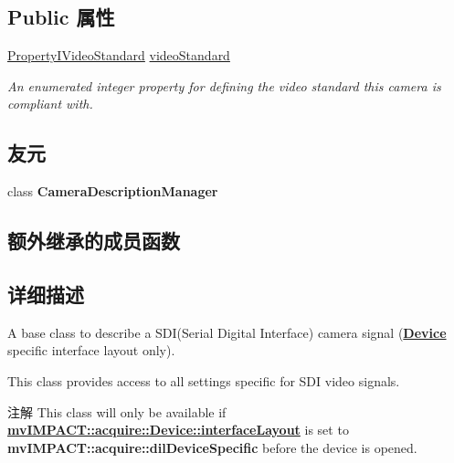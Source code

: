 \subsection*{Public 属性}
\begin{DoxyCompactItemize}
\item 
\hyperlink{group___device_specific_interface_ga8b964e42762ee1cba12e1b4bd9c9f114}{Property\+I\+Video\+Standard} \hyperlink{classmv_i_m_p_a_c_t_1_1acquire_1_1_camera_description_s_d_i_a6ba8278510409ac4019fd858f3af3452}{video\+Standard}
\begin{DoxyCompactList}\small\item\em An enumerated integer property for defining the video standard this camera is compliant with. \end{DoxyCompactList}\end{DoxyCompactItemize}
\subsection*{友元}
\begin{DoxyCompactItemize}
\item 
\hypertarget{classmv_i_m_p_a_c_t_1_1acquire_1_1_camera_description_s_d_i_a754f74db1fd8a2e7cf0bca76c10d00dd}{class {\bfseries Camera\+Description\+Manager}}\label{classmv_i_m_p_a_c_t_1_1acquire_1_1_camera_description_s_d_i_a754f74db1fd8a2e7cf0bca76c10d00dd}

\end{DoxyCompactItemize}
\subsection*{额外继承的成员函数}


\subsection{详细描述}
A base class to describe a S\+D\+I(\+Serial Digital Interface) camera signal ({\bfseries \hyperlink{classmv_i_m_p_a_c_t_1_1acquire_1_1_device}{Device}} specific interface layout only). 

This class provides access to all settings specific for S\+D\+I video signals.

\begin{DoxyNote}{注解}
This class will only be available if {\bfseries \hyperlink{classmv_i_m_p_a_c_t_1_1acquire_1_1_device_ab4dd0ecc9d456bb5ddc01d844c9d6f2d}{mv\+I\+M\+P\+A\+C\+T\+::acquire\+::\+Device\+::interface\+Layout}} is set to {\bfseries mv\+I\+M\+P\+A\+C\+T\+::acquire\+::dil\+Device\+Specific} before the device is opened. 
\end{DoxyNote}


